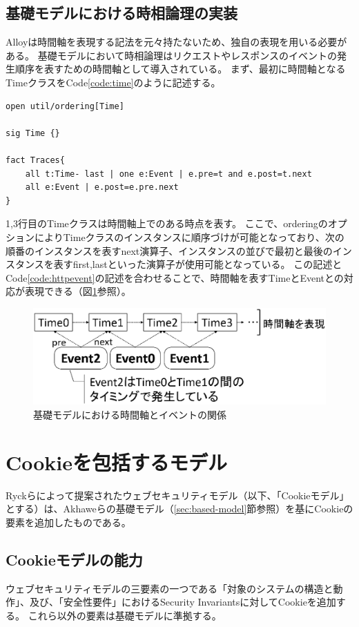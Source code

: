 \documentclass[12pt,a4paper]{jbook}
\begin{document}
\subsection{基礎モデルにおける時相論理の実装}
\label{sec:based-model-temporal-logic}
Alloyは時間軸を表現する記法を元々持たないため、独自の表現を用いる必要がある。
基礎モデルにおいて時相論理はリクエストやレスポンスのイベントの発生順序を表すための時間軸として導入されている。
まず、最初に時間軸となるTimeクラスをCode\ref{code:time}のように記述する。
\begin{lstlisting}[caption=基礎モデルにおける時間軸, label=code:time]
open util/ordering[Time]

sig Time {}

fact Traces{
	all t:Time- last | one e:Event | e.pre=t and e.post=t.next
	all e:Event | e.post=e.pre.next
}
\end{lstlisting}
1,3行目のTimeクラスは時間軸上でのある時点を表す。
ここで、orderingのオプションによりTimeクラスのインスタンスに順序づけが可能となっており、次の順番のインスタンスを表すnext演算子、インスタンスの並びで最初と最後のインスタンスを表すfirst,lastといった演算子が使用可能となっている。
この記述とCode\ref{code:httpevent}の記述を合わせることで、時間軸を表すTimeとEventとの対応が表現できる（図\ref{fig:based-model-temporal-logic}参照）。

\begin{figure}[htb]
\centering
\includegraphics[width=350pt]{./fig/based-model-temporal-logic.eps}
\caption{基礎モデルにおける時間軸とイベントの関係}
\label{fig:based-model-temporal-logic}
\end{figure}

\section{Cookieを包括するモデル}
\label{sec:cookie-model}
Ryckらによって提案されたウェブセキュリティモデル\cite{cookie-model}（以下、「Cookieモデル」とする）は、Akhaweらの基礎モデル（\ref{sec:based-model}節参照）を基にCookieの要素を追加したものである。

\subsection{Cookieモデルの能力}
ウェブセキュリティモデルの三要素の一つである「対象のシステムの構造と動作」、及び、「安全性要件」におけるSecurity Invariantsに対してCookieを追加する。
これら以外の要素は基礎モデルに準拠する。
\end{document}
